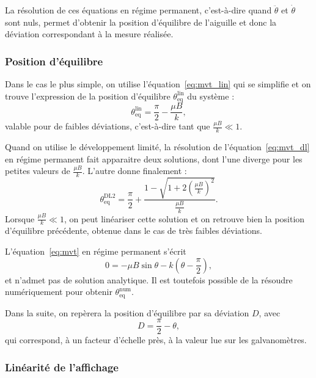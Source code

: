 \documentclass[12pt,a4paper,fleqn]{article}
\newcommand{\cad}{c'est-à-dire}
\begin{document}
La résolution de ces équations en régime permanent, \cad{} quand $\ddot{\theta}$ et $\dot{\theta}$ sont nuls, permet d'obtenir la position d'équilibre de l'aiguille et donc la déviation correspondant à la mesure réalisée.

\subsubsection{Position d'équilibre}

Dans le cas le plus simple, on utilise l'équation~\ref{eq:mvt_lin} qui se simplifie et on trouve l'expression de la position d'équilibre $\theta_\mathrm{eq}^\mathrm{lin}$ du système :
\begin{equation}
    \theta_\mathrm{eq}^\mathrm{lin} = \frac{\pi}{2} - \frac{\mu B}{k},
    \label{eq:sol_lin}
\end{equation}
valable pour de faibles déviations, \cad{} tant que $\frac{\mu B}{k} \ll 1$.

Quand on utilise le développement limité, la résolution de l'équation~\ref{eq:mvt_dl} en régime permanent fait apparaitre deux solutions, dont l'une diverge pour les petites valeurs de $\tfrac{\mu B}{k}$.
L'autre donne finalement :
\begin{equation}
    \theta_\mathrm{eq}^\mathrm{DL2} = \frac{\pi}{2} + \frac{1-\sqrt{1+2\left(\frac{\mu B}{k}\right)^2}}{\frac{\mu B}{k}}.
    \label{eq:sol_dl}
\end{equation}
Lorsque $\frac{\mu B}{k} \ll 1$, on peut linéariser cette solution et on retrouve bien la position d'équilibre précédente, obtenue dans le cas de très faibles déviations.

L'équation~\ref{eq:mvt} en régime permanent s'écrit
\begin{equation}
    0 = -\mu B \sin \theta - k\left(\theta-\frac{\pi}{2}\right),
    \label{eq:sol_num}
\end{equation}
et n'admet pas de solution analytique.
Il est toutefois possible de la résoudre numériquement pour obtenir $\theta_\mathrm{eq}^\mathrm{num}$.

Dans la suite, on repèrera la position d'équilibre par sa déviation $D$, avec
\begin{equation}
    D = \frac{\pi}{2} - \theta,
\end{equation}
qui correspond, à un facteur d'échelle près, à la valeur lue sur les galvanomètres.


\subsubsection{Linéarité de l'affichage}
\end{document}
